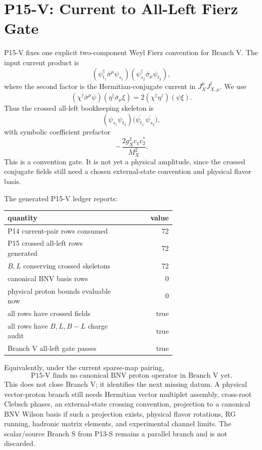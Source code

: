 \documentclass[11pt]{article}
\begin{document}
\section{P15-V: Current to All-Left Fierz Gate}

P15-V fixes one explicit two-component Weyl Fierz convention for Branch V.  The
input current product is
\begin{equation}
  (\psi_{t_1}^\dagger\bar\sigma^\mu\psi_{s_1})
  (\psi_{s_2}^\dagger\bar\sigma_\mu\psi_{t_2}),
\end{equation}
where the second factor is the Hermitian-conjugate current in
$J_X^\mu J_{X,\mu}^\dagger$.  We use
\begin{equation}
  (\chi^\dagger\bar\sigma^\mu\psi)
  (\eta^\dagger\bar\sigma_\mu\xi)
  =
  2(\chi^\dagger\eta^\dagger)(\psi\xi).
\end{equation}
Thus the crossed all-left bookkeeping skeleton is
\begin{equation}
  (\psi_{s_1}\psi_{t_2})
  \bigl(\overline{\psi_{t_1}}\,\overline{\psi_{s_2}}\bigr),
\end{equation}
with symbolic coefficient prefactor
\begin{equation}
  -\,\frac{2g_X^2 c_1c_2^\ast}{M_X^2}.
\end{equation}
This is a convention gate.  It is not yet a physical amplitude, since the
crossed conjugate fields still need a chosen external-state convention and
physical flavor basis.

The generated P15-V ledger reports:
\begin{center}
\small
\begin{tabular}{p{0.66\linewidth}r}
\toprule
quantity & value\\
\midrule
P14 current-pair rows consumed & 72\\
P15 crossed all-left rows generated & 72\\
$B,L$ conserving crossed skeletons & 72\\
canonical BNV basis rows & 0\\
physical proton bounds evaluable now & 0\\
all rows have crossed fields & true\\
all rows have $B,L,B-L$ charge audit & true\\
Branch V all-left gate passes & true\\
\bottomrule
\end{tabular}
\end{center}
Equivalently, under the current sparse-map pairing,
\begin{equation}
  \boxed{
  \text{P15-V finds no canonical BNV proton operator in Branch V yet.}
  }
\end{equation}
This does not close Branch V; it identifies the next missing datum.  A physical
vector-proton branch still needs Hermitian vector multiplet assembly, cross-root
Clebsch phases, an external-state crossing convention, projection to a
canonical BNV Wilson basis if such a projection exists, physical flavor
rotations, RG running, hadronic matrix elements, and experimental channel
limits.  The scalar/source Branch S from P13-S remains a parallel branch and is
not discarded.
\end{document}
